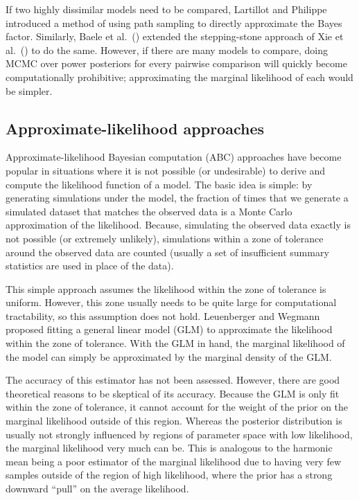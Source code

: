 If two highly dissimilar models need to be compared,
Lartillot and Philippe \citeyear{Lartillot2006} introduced a method of using
path sampling to directly approximate the Bayes factor.
Similarly, Baele et al.\ (\citeyear{Baele2013}) extended the stepping-stone
approach of Xie et al.\  (\citeyear{Xie2011}) to do the same.
However, if there are many models to compare, doing MCMC over power posteriors
for every pairwise comparison will quickly become computationally prohibitive;
approximating the marginal likelihood of each would be simpler.

\subsection{Approximate-likelihood approaches}

Approximate-likelihood Bayesian computation (ABC) approaches
\citep{Tavare1997,Beaumont2002} have become popular in situations where it is
not possible (or undesirable) to derive and compute the likelihood function of
a model.
The basic idea is simple: by generating simulations under the model, the
fraction of times that we generate a simulated dataset that matches the observed
data is a Monte Carlo approximation of the likelihood.
Because, simulating the observed data exactly is not possible (or extremely
unlikely), simulations within a zone of tolerance around the observed data are
counted (usually a set of insufficient summary statistics are used in place of
the data).

This simple approach assumes the likelihood within the zone of tolerance is
uniform.
However, this zone usually needs to be quite large for computational
tractability, so this assumption does not hold.
Leuenberger and Wegmann \citep{Leuenberger2010} proposed fitting a general
linear model (GLM) to approximate the likelihood within the zone of tolerance.
With the GLM in hand, the marginal likelihood of the model can simply be
approximated by the marginal density of the GLM.

The accuracy of this estimator has not been assessed.
However, there are good theoretical reasons to be skeptical of its accuracy.
Because the GLM is only fit within the zone of tolerance, it cannot account for
the weight of the prior on the marginal likelihood outside of this region.
Whereas the posterior distribution is usually not strongly influenced by
regions of parameter space with low likelihood, the marginal likelihood very
much can be.
This is analogous to the harmonic mean being a poor estimator of the marginal
likelihood due to having very few samples outside of the region of high
likelihood, where the prior has a strong downward ``pull'' on the average
likelihood.

